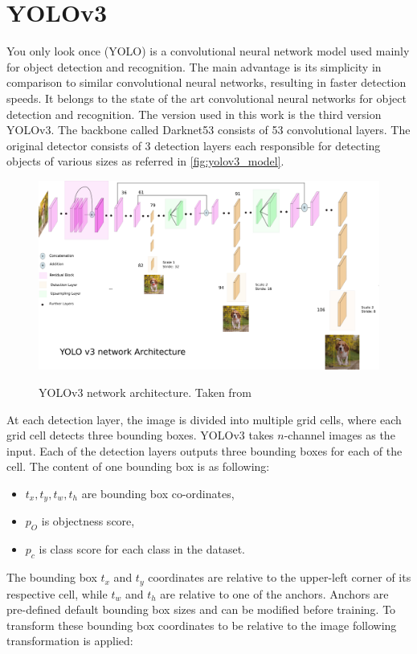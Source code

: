 \documentclass[twoside]{ctuthesis}
\theoremstyle{plain}
\theoremstyle{definition}
\theoremstyle{note}
\begin{document}
\section{YOLOv3}
You only look once (YOLO) is a convolutional neural network model used mainly for object detection and recognition\cite{redmon2016look}. The main advantage is its simplicity in comparison to similar convolutional neural networks, resulting in faster detection speeds. It belongs to the state of the art convolutional neural networks for object detection and recognition. The version used in this work is the third version YOLOv3\cite{redmon2018yolov3}. The backbone called Darknet53 consists of 53 convolutional layers. The original detector consists of 3 detection layers each responsible for detecting objects of various sizes as referred in \autoref{fig:yolov3_model}. 
\begin{figure}
	\caption{YOLOv3 network architecture. Taken from \cite{kathuria_2018}}
	\centering
	\includegraphics[width=\textwidth]{yolov3_model.png}
	\label{fig:yolov3_model}
\end{figure}
At each detection layer, the image is divided into multiple grid cells, where each grid cell detects three bounding boxes. YOLOv3 takes $n$-channel images as the input. Each of the detection layers outputs three bounding boxes for each of the cell. The content of one bounding box is as following:
\begin{itemize}
	\item $t_x, t_y, t_w, t_h$ are bounding box co-ordinates,
	\item $p_O$ is objectness score,
	\item $p_c$ is class score for each class in the dataset.
\end{itemize}
The bounding box $t_x$ and $t_y$ coordinates are relative to the upper-left corner of its respective cell, while $t_w$ and $t_h$ are relative to one of the anchors. Anchors are pre-defined default bounding box sizes and can be modified before training. To transform these bounding box coordinates to be relative to the image following transformation is applied:
\end{document}
